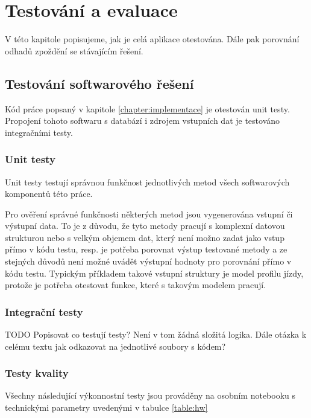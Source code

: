 

\chapter{Testování a evaluace}


V této kapitole popisujeme, jak je celá aplikace otestována. Dále pak porovnání odhadů zpoždění se stávajícím řešení.


\section{Testování softwarového řešení}


Kód práce popsaný v kapitole \ref{chapter:implementace} je otestován unit testy. Propojení tohoto softwaru s databází i zdrojem vstupních dat je testováno integračními testy.


\subsection{Unit testy} 


Unit testy testují správnou funkčnost jednotlivých metod všech softwarových komponentů této práce.


Pro ověření správné funkčnosti některých metod jsou vygenerována vstupní či výstupní data. To je z důvodu, že tyto metody pracují s komplexní datovou strukturou nebo s velkým objemem dat, který není možno zadat jako vstup přímo v kódu testu, resp. je potřeba porovnat výstup testované metody a ze stejných důvodů není možné uvádět výstupní hodnoty pro porovnání přímo v kódu testu. Typickým příkladem takové vstupní struktury je model profilu jízdy, protože je potřeba otestovat funkce, které s takovým modelem pracují.


\subsection{Integrační testy}


TODO Popisovat co testují testy? Není v tom žádná složitá logika. Dále otázka k celému textu jak odkazovat na jednotlivé soubory s kódem?


\subsection{Testy kvality}


Všechny následující výkonnostní testy jsou prováděny na osobním notebooku s technickými parametry uvedenými v tabulce \ref{table:hw}


